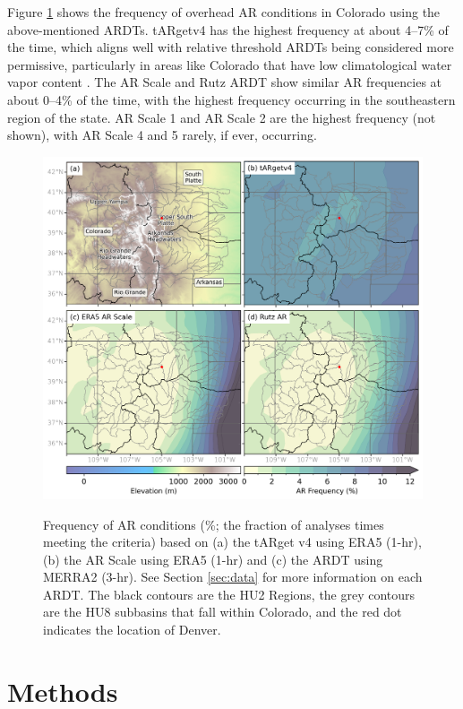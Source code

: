 \documentclass[draft]{agujournal2019}
\begin{document}
Figure \ref{fig:ar_overhead} shows the frequency of overhead AR conditions in Colorado using the above-mentioned ARDTs.  tARgetv4 has the highest frequency at about 4--7\% of the time, which aligns well with relative threshold ARDTs being considered more permissive, particularly in areas like Colorado that have low climatological water vapor content \cite{Rutz2019ARTMIP}. The AR Scale and Rutz ARDT show similar AR frequencies at about 0--4\% of the time, with the highest frequency occurring in the southeastern region of the state. AR Scale 1 and AR Scale 2 are the highest frequency (not shown), with AR Scale 4 and 5 rarely, if ever, occurring. 

\begin{figure}
\noindent\includegraphics[width=\textwidth, height=\textheight, keepaspectratio]{fig1.png}
\label{fig:ar_overhead}
\caption{Frequency of AR conditions (\%; the fraction of analyses times meeting the criteria)  based on (a) the  tARget v4 using ERA5 (1-hr), (b) the AR Scale \cite{MartinRalph2019} using ERA5 (1-hr) and (c) the  ARDT using MERRA2 (3-hr). See Section \ref{sec:data} for more information on each ARDT. The black contours are the HU2 Regions, the grey contours are the HU8 subbasins that fall within Colorado, and the red dot indicates the location of Denver.}
\end{figure}

\section{Methods}
\label{sec:methods}
\end{document}
